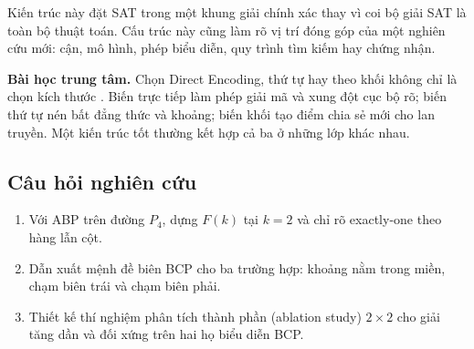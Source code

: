 Kiến trúc này đặt SAT trong một khung giải chính xác thay vì coi bộ giải SAT là
toàn bộ thuật toán. Cấu trúc này cũng làm rõ vị trí đóng góp của một nghiên cứu mới: cận, mô
hình, phép biểu diễn, quy trình tìm kiếm hay chứng nhận.

\begin{summarybox}
\textbf{Bài học trung tâm.} Chọn Direct Encoding, thứ tự hay theo khối không
chỉ là chọn kích thước \CNF. Biến trực tiếp làm phép giải mã và xung đột cục bộ
rõ; biến thứ tự nén bất đẳng thức và khoảng; biến khối tạo điểm chia sẻ mới cho
lan truyền. Một kiến trúc tốt thường kết hợp cả ba ở những lớp khác nhau.
\end{summarybox}

\subsection*{Câu hỏi nghiên cứu}
\begin{enumerate}
  \item Với ABP trên đường \(P_4\), dựng \(F(k)\) tại \(k=2\) và chỉ rõ
        exactly-one theo hàng lẫn cột.
  \item Dẫn xuất mệnh đề biên BCP cho ba trường hợp: khoảng nằm trong
        miền, chạm biên trái và chạm biên phải.
  \item Thiết kế thí nghiệm phân tích thành phần (ablation study) \(2\times2\) cho giải tăng dần và đối xứng
        trên hai họ biểu diễn BCP.
\end{enumerate}
